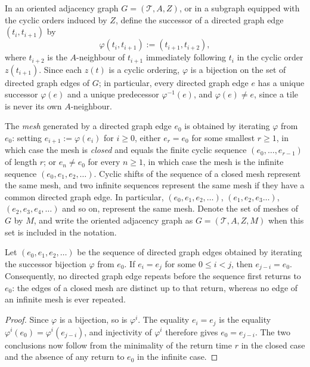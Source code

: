 \begin{definition}\label{def:mesh}
    In an oriented adjacency graph $G=(\mathcal{T},A,Z)$, or in a subgraph equipped with the cyclic orders induced by $Z$, define the successor of a directed graph edge $(t_i,t_{i+1})$ by
    $$
        \varphi(t_i,t_{i+1}):=(t_{i+1},t_{i+2}),
    $$
    where $t_{i+2}$ is the $A$-neighbour of $t_{i+1}$ immediately following $t_i$ in the cyclic order $z(t_{i+1})$.
    Since each $z(t)$ is a cyclic ordering, $\varphi$ is a bijection on the set of directed graph edges of $G$; in particular, every directed graph edge $e$ has a unique successor $\varphi(e)$ and a unique predecessor $\varphi^{-1}(e)$, and $\varphi(e)\neq e$, since a tile is never its own $A$-neighbour.

    The \emph{mesh} generated by a directed graph edge $e_0$ is obtained by iterating $\varphi$ from $e_0$: setting $e_{i+1}:=\varphi(e_i)$ for $i\geq0$, either $e_r=e_0$ for some smallest $r\geq1$, in which case the mesh is \emph{closed} and equals the finite cyclic sequence $(e_0,\dots,e_{r-1})$ of length $r$; or $e_n\neq e_0$ for every $n\geq1$, in which case the mesh is the infinite sequence $(e_0,e_1,e_2,\dots)$.
    Cyclic shifts of the sequence of a closed mesh represent the same mesh, and two infinite sequences represent the same mesh if they have a common directed graph edge.
    In particular, $(e_0,e_1,e_2,\dots)$, $(e_1,e_2,e_3\dots)$, $(e_2,e_3,e_4,\dots)$ and so on, represent the same mesh.
    Denote the set of meshes of $G$ by $M$, and write the oriented adjacency graph as $G=(\mathcal{T},A,Z,M)$ when this set is included in the notation.
\end{definition}

\begin{lemma}\label{lemma:mesh-no-premature-repetition}
    Let $(e_0,e_1,e_2,\dots)$ be the sequence of directed graph edges obtained by iterating the successor bijection $\varphi$ from $e_0$.
    If $e_i=e_j$ for some $0\leq i<j$, then $e_{j-i}=e_0$.
    Consequently, no directed graph edge repeats before the sequence first returns to $e_0$: the edges of a closed mesh are distinct up to that return, whereas no edge of an infinite mesh is ever repeated.
\end{lemma}

\begin{proof}
    Since $\varphi$ is a bijection, so is $\varphi^i$.
    The equality $e_i=e_j$ is the equality $\varphi^i(e_0)=\varphi^i(e_{j-i})$, and injectivity of $\varphi^i$ therefore gives $e_0=e_{j-i}$.
    The two conclusions now follow from the minimality of the return time $r$ in the closed case and the absence of any return to $e_0$ in the infinite case.
\end{proof}

